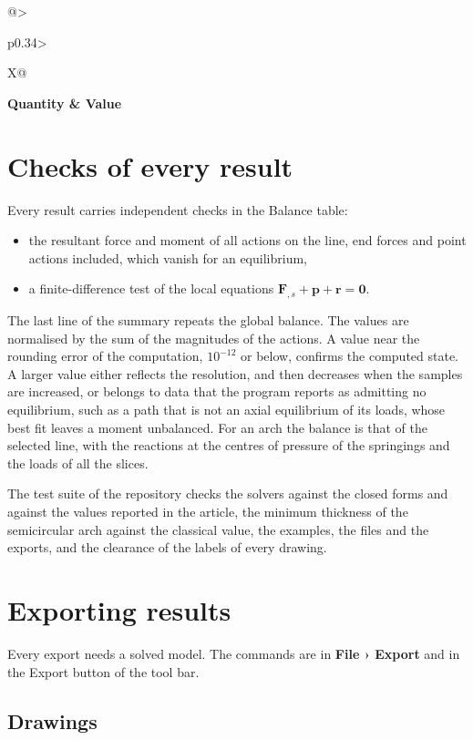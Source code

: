 \documentclass[fontsize=10.5pt,paper=a4,parskip=half,headings=normal,numbers=noenddot,
  open=any,bibliography=totoc,captions=tableheading]{scrreprt}
\makeatletter
\numberwithin{figure}{chapter}
\numberwithin{table}{chapter}
\newcommand{\F}{\mathbf F}
\newcommand{\pp}{\mathbf p}
\newcommand{\rr}{\mathbf r}
\newcommand{\menu}[1]{{\sffamily\bfseries\color{ink}#1}}
\newcommand{\ui}[1]{{\sffamily\color{ink}#1}}
\newcommand{\summarytable}[1]{{\par\needspace{10\baselineskip}\small\setlength{\LTpre}{2pt}\setlength{\LTpost}{2pt}%
  \begin{xltabular}{\linewidth}{@{}>{\leavevmode\color{ink}\sffamily\raggedright\arraybackslash}p{0.34\linewidth}>{\raggedright\arraybackslash}X@{}}
  \toprule \normalfont\bfseries Quantity & \bfseries Value\\ \midrule\endhead
  \bottomrule\endfoot #1 \end{xltabular}\par}}
\makeatother
\begin{document}
\summarytable{\SummaryArchThickness}

\chapter{Checks of every result}\label{ch:checks}

Every result carries independent checks in the \ui{Balance} table:
\begin{itemize}
\item the resultant force and moment of all actions on the line, end forces and point actions included,
which vanish for an equilibrium,
\item a finite-difference test of the local equations $\F_{,s}+\pp+\rr=\mathbf 0$.
\end{itemize}
The last line of the summary repeats the global balance. The values are normalised by the sum of the
magnitudes of the actions. A value near the rounding error of the computation, $10^{-12}$ or below,
confirms the computed state. A larger value either reflects the resolution, and then decreases when the
samples are increased, or belongs to data that the program reports as admitting no equilibrium, such
as a path that is not an axial equilibrium of its loads, whose best fit leaves a moment unbalanced. For
an arch the balance is that of the selected line, with the reactions at the centres of pressure of the
springings and the loads of all the slices.

The test suite of the repository checks the solvers against the closed forms and against the values
reported in the article, the minimum thickness of the semicircular arch against the classical value, the
examples, the files and the exports, and the clearance of the labels of every drawing.

\chapter{Exporting results}\label{ch:export}

Every export needs a solved model. The commands are in \menu{File › Export} and in the \ui{Export}
button of the tool bar.

\section{Drawings}\label{sec:exdrawings}
\end{document}
